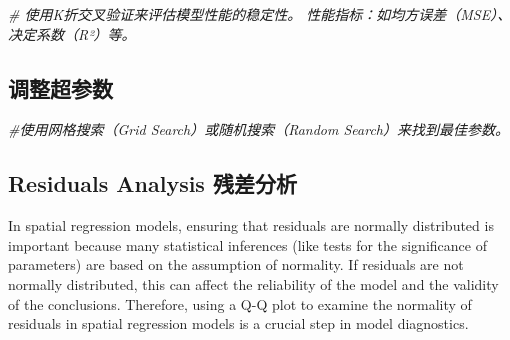 \documentclass[
]{article}
\newenvironment{Shaded}{\begin{snugshade}}{\end{snugshade}}
\newcommand{\CommentTok}[1]{\textcolor[rgb]{0.56,0.35,0.01}{\textit{#1}}}
\begin{document}
\begin{Shaded}
\begin{Highlighting}[]
\CommentTok{\# 使用K折交叉验证来评估模型性能的稳定性。 性能指标：如均方误差（MSE）、决定系数（R²）等。}
\end{Highlighting}
\end{Shaded}

\hypertarget{ux8c03ux6574ux8d85ux53c2ux6570}{%
\subsection{调整超参数}\label{ux8c03ux6574ux8d85ux53c2ux6570}}

\begin{Shaded}
\begin{Highlighting}[]
\CommentTok{\#使用网格搜索（Grid Search）或随机搜索（Random Search）来找到最佳参数。}
\end{Highlighting}
\end{Shaded}

\hypertarget{residuals-analysis-ux6b8bux5deeux5206ux6790}{%
\subsection{Residuals Analysis
残差分析}\label{residuals-analysis-ux6b8bux5deeux5206ux6790}}

In spatial regression models, ensuring that residuals are normally
distributed is important because many statistical inferences (like tests
for the significance of parameters) are based on the assumption of
normality. If residuals are not normally distributed, this can affect
the reliability of the model and the validity of the conclusions.
Therefore, using a Q-Q plot to examine the normality of residuals in
spatial regression models is a crucial step in model diagnostics.
\end{document}
